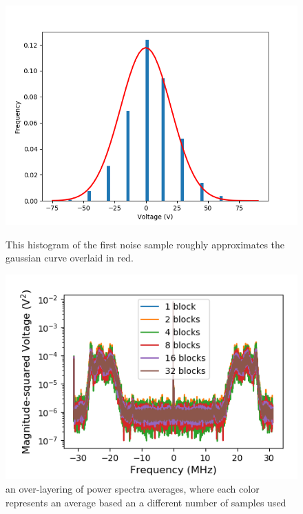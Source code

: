 \documentclass[a4paper]{article}
\begin{document}
\begin{figure}
\centering
\begin{minipage}{.5\textwidth}
	\centering
	\includegraphics[width=.9\linewidth]{5-7/histo}
	\caption{This histogram of the first noise \hfill \break sample  roughly approximates the \hfill \break gaussian curve overlaid in red.}
	\label{fig:histogram}
\end{minipage}%
\begin{minipage}{.5\textwidth}
	\centering
	\includegraphics[width=.9\linewidth]{5-7/comparison}
	\caption{an over-layering of power spectra averages, where each color represents an average based an a different number of samples used}
	\label{fig:avgs_comparison}
\end{minipage}
\end{figure}
\end{document}

